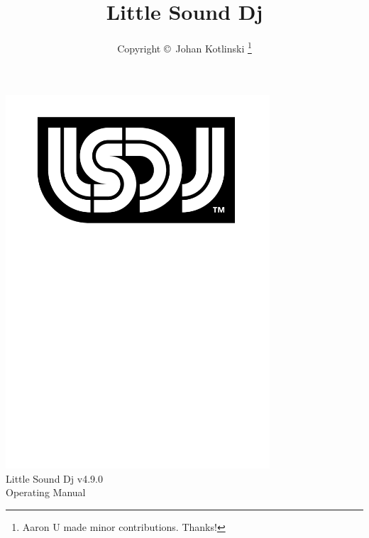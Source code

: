\documentclass[a4paper,12pt,titlepage]{book}
\author{Copyright \copyright~Johan Kotlinski \thanks{Aaron U made minor contributions. Thanks!}}
\title{Little Sound Dj \lsdjversion{}}
\newcommand{\lsdjversion}{v4.9.0}
\begin{document}
\begin{titlepage}
\begin{center}
\vspace*{2.75cm}
\includegraphics[width=9.85cm]{lsdj_black_rgb}\\
\vspace*{1.00cm}
\normalfont\sffamily
\LARGE
Little Sound Dj \lsdjversion{}
\\
\vspace*{0.65cm}
Operating Manual
\end{center}
\end{titlepage}

\maketitle
\tableofcontents








\end{document}
